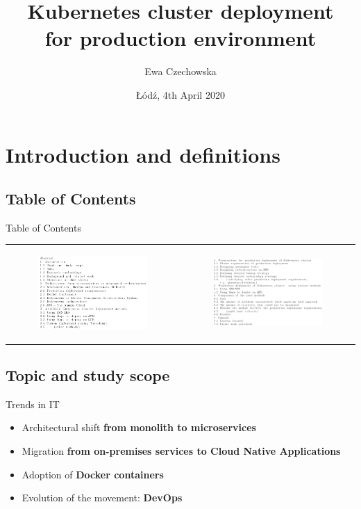 \documentclass{beamer}
\title{Kubernetes cluster deployment \\ for production environment}
\author{Ewa Czechowska}
\institute{Lodz University of Technology}
\date{Łódź, 4th April 2020}
\begin{document}
\maketitle

\section{Introduction and definitions}
\subsection{Table of Contents}
\begin{frame}{Table of Contents}%
\begin{center}
\begin{tabular}{@{}  l  l }
	\begin{figure}
		\includegraphics[width=5.5cm]{figures/table-of-c1.png}
		\label{fig:table-of-c1}
	\end{figure} &
	\begin{figure}
		\includegraphics[width=5.5cm]{figures/table-of-c2.png}
		\label{fig:table-of-c2}
	\end{figure} \\
	\end{tabular}
\end{center}
\end{frame}

\subsection{Topic and study scope}
\begin{frame}{Trends in IT}%
\begin{itemize}
\item Architectural shift {\bfseries from monolith to microservices}
\item Migration {\bfseries from on-premises services to Cloud Native Applications}
\item Adoption of {\bfseries Docker containers}
\item Evolution of the movement: {\bfseries DevOps}
\end{itemize}
\end{frame}
\end{document}
